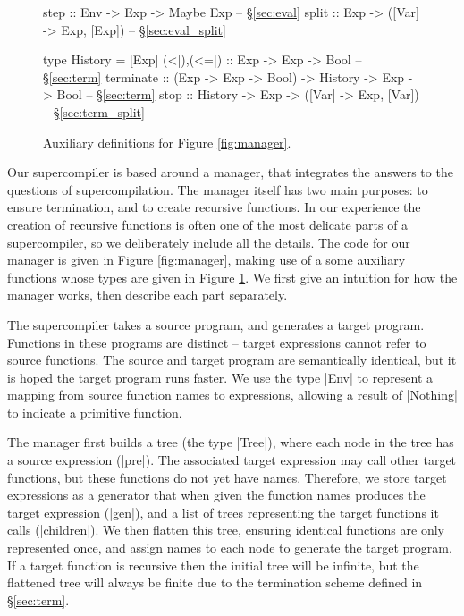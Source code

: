 \documentclass[draft]{sigplanconf}
\begin{document}
\begin{figure}
\begin{code}
step :: Env -> Exp -> Maybe Exp -- \S\ref{sec:eval}
split :: Exp -> ([Var] -> Exp, [Exp]) -- \S\ref{sec:eval_split}

type History = [Exp]
(<|),(<=|) :: Exp -> Exp -> Bool -- \S\ref{sec:term}
terminate  :: (Exp -> Exp -> Bool)
           -> History -> Exp -> Bool -- \S\ref{sec:term}
stop :: History -> Exp -> ([Var] -> Exp, [Var]) -- \S\ref{sec:term_split}
\end{code}
\caption{Auxiliary definitions for Figure \ref{fig:manager}.}
\label{fig:manager2}
\end{figure}

Our supercompiler is based around a manager, that integrates the answers to the questions of supercompilation. The manager itself has two main purposes: to ensure termination, and to create recursive functions. In our experience the creation of recursive functions is often one of the most delicate parts of a supercompiler, so we deliberately include all the details. The code for our manager is given in Figure \ref{fig:manager}, making use of a some auxiliary functions whose types are given in Figure \ref{fig:manager2}. We first give an intuition for how the manager works, then describe each part separately.

The supercompiler takes a source program, and generates a target program. Functions in these programs are distinct -- target expressions cannot refer to source functions. The source and target program are semantically identical, but it is hoped the target program runs faster. We use the type |Env| to represent a mapping from source function names to expressions, allowing a result of |Nothing| to indicate a primitive function.

The manager first builds a tree (the type |Tree|), where each node in the tree has a source expression (|pre|). The associated target expression may call other target functions, but these functions do not yet have names. Therefore, we store target expressions as a generator that when given the function names produces the target expression (|gen|), and a list of trees representing the target functions it calls (|children|). We then flatten this tree, ensuring identical functions are only represented once, and assign names to each node to generate the target program. If a target function is recursive then the initial tree will be infinite, but the flattened tree will always be finite due to the termination scheme defined in \S\ref{sec:term}.
\end{document}
